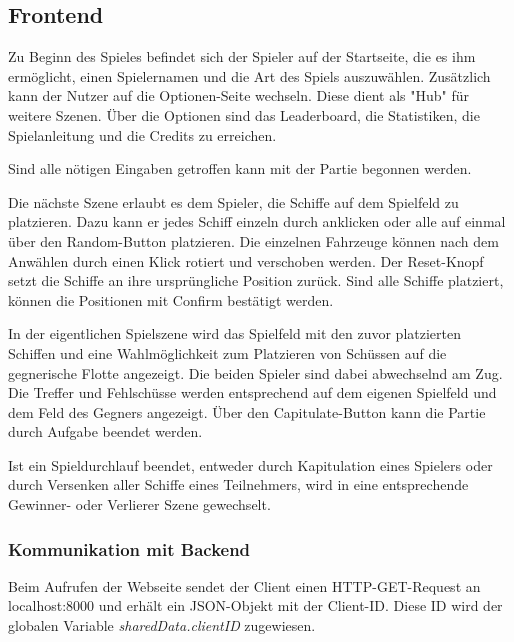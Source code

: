 \documentclass[a4paper, 10pt, conference]{IEEEtran}
\begin{document}
\subsection{Frontend}\label{subsec:frontend}

Zu Beginn des Spieles befindet sich der Spieler auf der Startseite, die es ihm ermöglicht, einen Spielernamen und die Art des Spiels auszuwählen. Zusätzlich kann der Nutzer auf die Optionen-Seite wechseln. Diese dient als "Hub" für weitere Szenen. Über die Optionen sind das Leaderboard, die Statistiken, die Spielanleitung und die Credits zu erreichen. 


Sind alle nötigen Eingaben getroffen kann mit der Partie begonnen werden.

Die nächste Szene erlaubt es dem Spieler, die Schiffe auf dem Spielfeld zu platzieren. Dazu kann er jedes Schiff einzeln durch anklicken oder alle auf einmal über den Random-Button platzieren. Die einzelnen Fahrzeuge können nach dem Anwählen durch einen Klick rotiert und verschoben werden. Der Reset-Knopf setzt die Schiffe an ihre ursprüngliche Position zurück. Sind alle Schiffe platziert, können die Positionen mit Confirm bestätigt werden.

In der eigentlichen Spielszene wird das Spielfeld mit den zuvor platzierten Schiffen und eine Wahlmöglichkeit zum Platzieren von Schüssen auf die gegnerische Flotte angezeigt. Die beiden Spieler sind dabei abwechselnd am Zug. Die Treffer und Fehlschüsse werden entsprechend auf dem eigenen Spielfeld und dem Feld des Gegners angezeigt. Über den Capitulate-Button kann die Partie durch Aufgabe beendet werden. 

Ist ein Spieldurchlauf beendet, entweder durch Kapitulation eines Spielers oder durch Versenken aller Schiffe eines Teilnehmers, wird in eine entsprechende Gewinner- oder Verlierer Szene gewechselt.




\subsubsection{Kommunikation mit Backend}\label{subsec:comwithbackend}

Beim Aufrufen der Webseite sendet der Client einen HTTP-GET-Request an \glqq localhost:8000\grqq{} und erhält ein JSON-Objekt mit der Client-ID. Diese ID wird der globalen Variable \textit{sharedData.clientID} zugewiesen.
\end{document}
